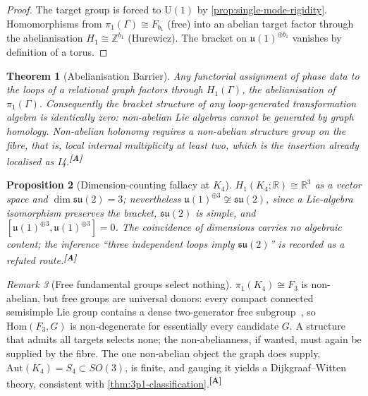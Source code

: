 \documentclass[12pt,a4paper,twoside]{article}
\theoremstyle{plain}
\newtheorem{theorem}{Theorem}[section]
\newtheorem{proposition}[theorem]{Proposition}
\theoremstyle{definition}
\theoremstyle{remark}
\newtheorem{remark}[theorem]{Remark}
\newcommand{\catmark}[1]{\textsuperscript{\textsf{\textbf{[#1]}}}}
\begin{document}
\begin{proof}
The target group is forced to $\mathrm{U}(1)$ by
\cref{prop:single-mode-rigidity}. Homomorphisms from
$\pi_1(\Gamma)\cong F_{b_1}$ (free) into an abelian target factor through
the abelianisation $H_1\cong\mathbb{Z}^{b_1}$ (Hurewicz). The bracket on
$\mathfrak{u}(1)^{\oplus b_1}$ vanishes by definition of a torus.
\end{proof}

\begin{theorem}[Abelianisation Barrier]
\label{thm:abelianisation-barrier}
Any functorial assignment of phase data to the loops of a relational graph
factors through $H_1(\Gamma)$, the abelianisation of $\pi_1(\Gamma)$.
Consequently the bracket structure of any loop-generated transformation
algebra is identically zero: non-abelian Lie algebras cannot be generated
by graph homology. Non-abelian holonomy requires a non-abelian structure
group on the fibre, that is, local internal multiplicity at least two,
which is the insertion already localised as I4.\catmark{A}
\end{theorem}

\begin{proposition}[Dimension-counting fallacy at $K_4$]
\label{prop:k4-fallacy}
$H_1(K_4;\mathbb{R})\cong\mathbb{R}^3$ as a vector space and
$\dim\mathfrak{su}(2)=3$; nevertheless
$\mathfrak{u}(1)^{\oplus 3}\not\cong\mathfrak{su}(2)$, since a Lie-algebra
isomorphism preserves the bracket, $\mathfrak{su}(2)$ is simple, and
$[\mathfrak{u}(1)^{\oplus 3},\mathfrak{u}(1)^{\oplus 3}]=0$. The
coincidence of dimensions carries no algebraic content; the inference
``three independent loops imply $\mathfrak{su}(2)$'' is recorded as a
refuted route.\catmark{A}
\end{proposition}

\begin{remark}[Free fundamental groups select nothing]
\label{rem:universal-donor}
$\pi_1(K_4)\cong F_3$ is non-abelian, but free groups are universal
donors: every compact connected semisimple Lie group contains a dense
two-generator free subgroup~\cite{kuranishi1951}, so
$\mathrm{Hom}(F_3,G)$ is non-degenerate for essentially every candidate
$G$. A structure that admits all targets selects none; the
non-abelianness, if wanted, must again be supplied by the fibre. The one
non-abelian object the graph does supply,
$\mathrm{Aut}(K_4)=S_4\subset SO(3)$, is finite, and gauging it yields a
Dijkgraaf--Witten theory, consistent with
\cref{thm:3p1-classification}.\catmark{A}
\end{remark}
\end{document}
